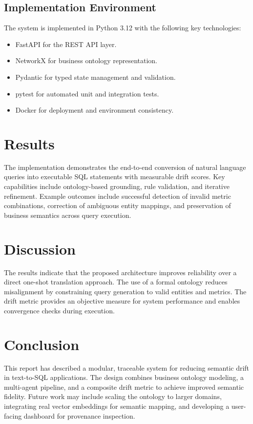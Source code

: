 \documentclass[12pt,a4paper]{article}
\begin{document}
\subsection{Implementation Environment}
The system is implemented in Python 3.12 with the following key technologies:
\begin{itemize}[leftmargin=*]
  \item FastAPI for the REST API layer.
  \item NetworkX for business ontology representation.
  \item Pydantic for typed state management and validation.
  \item pytest for automated unit and integration tests.
  \item Docker for deployment and environment consistency.
\end{itemize}

\section{Results}
The implementation demonstrates the end-to-end conversion of natural language queries into executable SQL statements with measurable drift scores. Key capabilities include ontology-based grounding, rule validation, and iterative refinement. Example outcomes include successful detection of invalid metric combinations, correction of ambiguous entity mappings, and preservation of business semantics across query execution.

\section{Discussion}
The results indicate that the proposed architecture improves reliability over a direct one-shot translation approach. The use of a formal ontology reduces misalignment by constraining query generation to valid entities and metrics. The drift metric provides an objective measure for system performance and enables convergence checks during execution.

\section{Conclusion}
This report has described a modular, traceable system for reducing semantic drift in text-to-SQL applications. The design combines business ontology modeling, a multi-agent pipeline, and a composite drift metric to achieve improved semantic fidelity. Future work may include scaling the ontology to larger domains, integrating real vector embeddings for semantic mapping, and developing a user-facing dashboard for provenance inspection.
\end{document}
